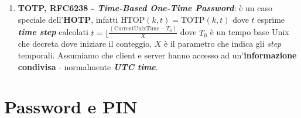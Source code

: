 \begin{flushleft}
\begin{enumerate}[nosep]
    \item \textbf{TOTP, RFC6238 - \textit{Time-Based One-Time Password}}: è un caso speciale dell'\textbf{HOTP}, infatti $\text{HTOP}(k, t) = \text{TOTP}(k, t)$ dove $t$ esprime \textbf{\textit{time step}} calcolati $t = \lfloor \frac{(\text{CurrentUnixTime} - T_0)}{X}$ dove $T_0$ è un tempo base Unix che decreta dove iniziare il conteggio, $X$ è il parametro che indica gli \textit{step} temporali. Assumiamo che client e server hanno accesso ad un'\textbf{informazione condivisa} - normalmente \textbf{\textit{UTC time}}.
    \end{enumerate}
\end{flushleft}

\section{Password e PIN}